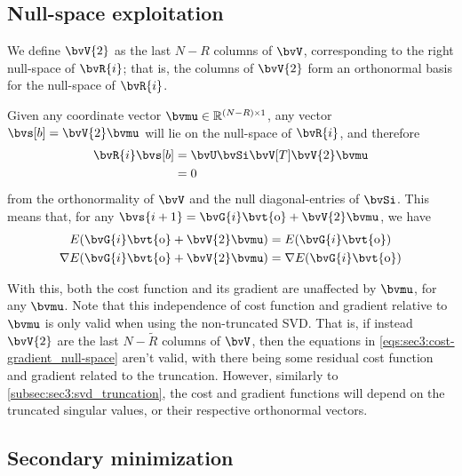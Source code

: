 \subsection{Null-space exploitation}

We define $\bvV{2}$ as the last $N-R$ columns of $\bvV$, corresponding to the right null-space of $\bvR{i}$; that is, the columns of $\bvV{2}$ form an orthonormal basis for the null-space of $\bvR{i}$.

Given any coordinate vector $\bvmu \in \re^{\sz{(N-R)}{1}}$, any vector $\bvs[b] = \bvV{2} \bvmu$ will lie on the null-space of $\bvR{i}$, and therefore
\begin{equation}
	\begin{split}
		\bvR{i} \bvs[b] 
		& = \bvU \bvSi \bvV[T] \bvV{2} \bvmu \\
		& = 0
	\end{split}
\end{equation}
from the orthonormality of $\bvV$ and the null diagonal-entries of $\bvSi$. This means that, for any $\bvs{i+1} = \bvG{i} \bvt{\obs} + \bvV{2} \bvmu$, we have
\begin{subequations}
	\begin{gather}
		E(\bvG{i} \bvt{\obs} + \bvV{2} \bvmu) = E(\bvG{i} \bvt{\obs})\\
		\nabla E(\bvG{i} \bvt{\obs} + \bvV{2} \bvmu) = \nabla E(\bvG{i} \bvt{\obs})
	\end{gather}
	\label{eqs:sec3:cost-gradient_null-space}
\end{subequations}

With this, both the cost function and its gradient are unaffected by $\bvmu$, for any $\bvmu$. Note that this independence of cost function and gradient relative to $\bvmu$ is only valid when using the non-truncated SVD. That is, if instead $\bvV{2}$ are the last $N-\tilde{R}$ columns of $\bvV$, then the equations in \cref{eqs:sec3:cost-gradient_null-space} aren't valid, with there being some residual cost function and gradient related to the truncation. However, similarly to \cref{subsec:sec3:svd_truncation}, the cost and gradient functions will depend on the truncated singular values, or their respective orthonormal vectors.

\subsection{Secondary minimization}

